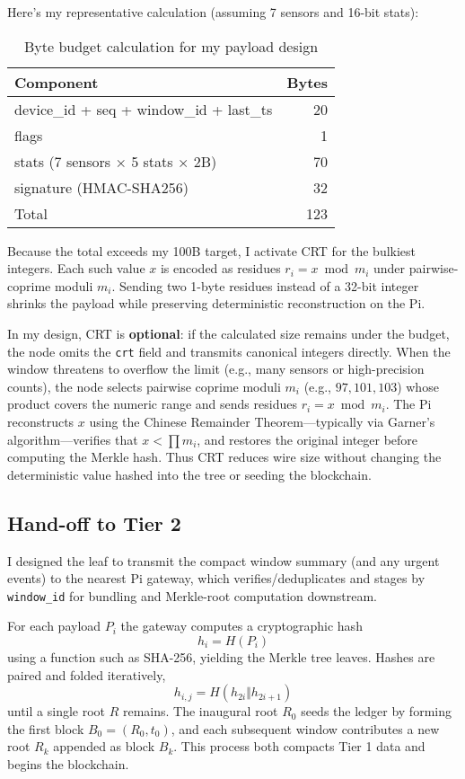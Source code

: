 \documentclass[12pt]{article}
\begin{document}
Here's my representative calculation (assuming 7 sensors and 16-bit stats):

\begin{table}[H]
\centering
\caption{Byte budget calculation for my payload design}
\begin{tabular}{|l|r|}
\hline
Component & Bytes \\
\hline
device\_id + seq + window\_id + last\_ts & 20 \\
flags & 1 \\
stats (7 sensors × 5 stats × 2B) & 70 \\
signature (HMAC-SHA256) & 32 \\
\hline
Total & 123 \\
\hline
\end{tabular}
\end{table}

Because the total exceeds my 100B target, I activate CRT for the bulkiest integers. Each such value \(x\) is encoded as residues \(r_i = x \bmod m_i\) under pairwise-coprime moduli \(m_i\). Sending two 1-byte residues instead of a 32-bit integer shrinks the payload while preserving deterministic reconstruction on the Pi.

In my design, CRT is \textbf{optional}: if the calculated size remains under the budget, the node omits the \texttt{crt} field and transmits canonical integers directly. When the window threatens to overflow the limit (e.g., many sensors or high-precision counts), the node selects pairwise coprime moduli \(m_i\) (e.g., \(97,101,103\)) whose product covers the numeric range and sends residues \(r_i = x \bmod m_i\). The Pi reconstructs \(x\) using the Chinese Remainder Theorem—typically via Garner's algorithm—verifies that \(x < \prod m_i\), and restores the original integer before computing the Merkle hash. Thus CRT reduces wire size without changing the deterministic value hashed into the tree or seeding the blockchain.

\subsection{Hand-off to Tier 2}

I designed the leaf to transmit the compact window summary (and any urgent events) to the nearest Pi gateway, which verifies/deduplicates and stages by \texttt{window\_id} for bundling and Merkle-root computation downstream.

For each payload \(P_i\) the gateway computes a cryptographic hash
\[ h_i = H(P_i) \]
using a function such as SHA-256, yielding the Merkle tree leaves. Hashes are paired and folded iteratively,
\[ h_{i,j} = H(h_{2i} \Vert h_{2i+1}) \]
until a single root \(R\) remains. The inaugural root \(R_0\) seeds the ledger by forming the first block \(B_0=(R_0, t_0)\), and each subsequent window contributes a new root \(R_k\) appended as block \(B_k\). This process both compacts Tier 1 data and begins the blockchain.
\end{document}
